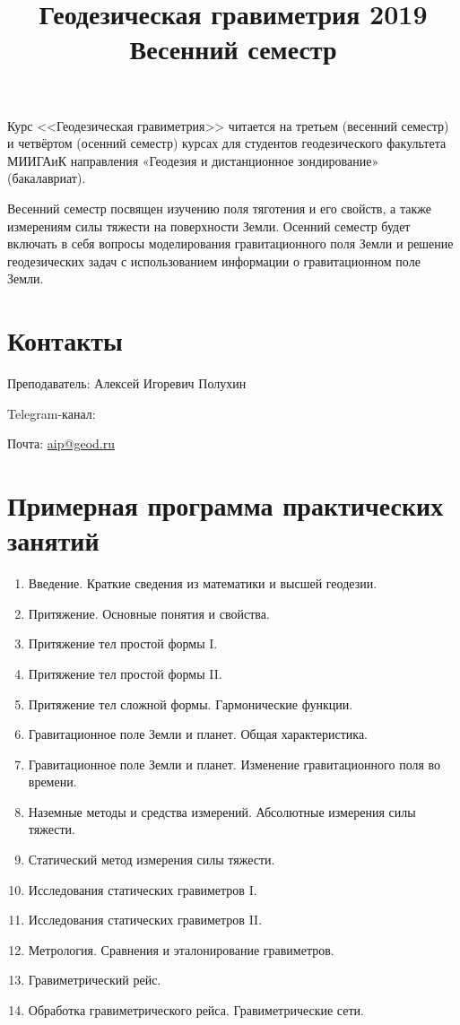 \documentclass[11pt, a4paper]{article}
\title{{Геодезическая гравиметрия 2019}\\ 
{\Large Весенний семестр}}
\author{}
\date{\DTMusedate{lessondate}}
\theoremstyle{plain}
\theoremstyle{definition}
\theoremstyle{remark}
\begin{document}
\maketitle

Курс <<Геодезическая гравиметрия>> читается на третьем (весенний семестр) и четвёртом (осенний семестр) курсах для студентов геодезического факультета МИИГАиК направления «Геодезия и дистанционное зондирование» (бакалавриат).

Весенний семестр посвящен изучению поля тяготения и его свойств, а также измерениям силы тяжести на поверхности Земли. 
Осенний семестр будет включать в себя вопросы моделирования гравитационного поля Земли и решение геодезических задач с использованием информации о гравитационном поле Земли.

\section{Контакты}
Преподаватель: Алексей Игоревич Полухин

Telegram-канал:

Почта: \href{mailto:aip@geod.ru}{aip@geod.ru}

\section{Примерная программа практических занятий}
\begin{enumerate}
    \item Введение. Краткие сведения из математики и высшей геодезии.
    \item Притяжение. Основные понятия и свойства.
    \item Притяжение тел простой формы I.
    \item Притяжение тел простой формы II.
    \item Притяжение тел сложной формы. Гармонические функции.
    \item Гравитационное поле Земли и планет. Общая характеристика.
    \item Гравитационное поле Земли и планет. Изменение гравитационного поля во времени.
    \item Наземные методы и средства измерений. Абсолютные измерения силы тяжести.
    \item Статический метод измерения силы тяжести.
    \item Исследования статических гравиметров I.
    \item Исследования статических гравиметров II.
    \item Метрология. Сравнения и эталонирование гравиметров.
    \item Гравиметрический рейс.
    \item Обработка гравиметрического рейса. Гравиметрические сети.
\end{enumerate}
\end{document}
